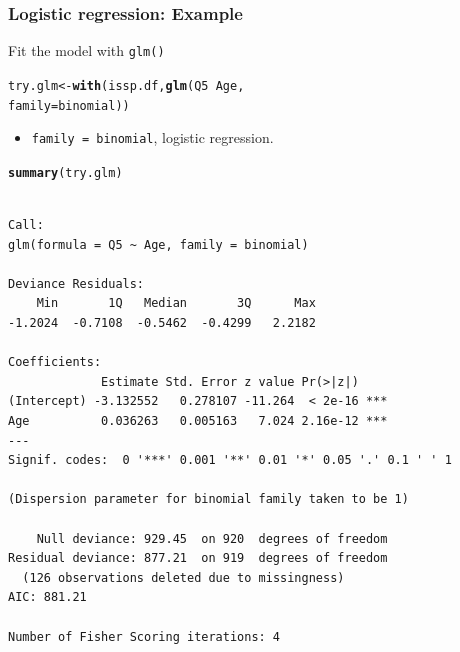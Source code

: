\documentclass{beamer}\usepackage[]{graphicx}\usepackage[]{color}
\makeatletter
\newcommand{\hlopt}[1]{\textcolor[rgb]{0,0,0}{#1}}%
\newcommand{\hlstd}[1]{\textcolor[rgb]{0.345,0.345,0.345}{#1}}%
\newcommand{\hlkwb}[1]{\textcolor[rgb]{0.69,0.353,0.396}{#1}}%
\newcommand{\hlkwc}[1]{\textcolor[rgb]{0.333,0.667,0.333}{#1}}%
\newcommand{\hlkwd}[1]{\textcolor[rgb]{0.737,0.353,0.396}{\textbf{#1}}}%
\newenvironment{kframe}{%
 \def\at@end@of@kframe{}%
 \ifinner\ifhmode%
  \def\at@end@of@kframe{\end{minipage}}%
  \begin{minipage}{\columnwidth}%
 \fi\fi%
 \def\FrameCommand##1{\hskip\@totalleftmargin \hskip-\fboxsep
 \colorbox{shadecolor}{##1}\hskip-\fboxsep
     \hskip-\linewidth \hskip-\@totalleftmargin \hskip\columnwidth}%
 \MakeFramed {\advance\hsize-\width
   \@totalleftmargin\z@ \linewidth\hsize
   \@setminipage}}%
 {\par\unskip\endMakeFramed%
 \at@end@of@kframe}
\newenvironment{knitrout}{}{} %
\makeatother
\begin{document}
\begin{frame}[fragile]
\frametitle{Logistic regression: Example}
Fit the model with \texttt{glm()}
\vspace{-2mm}
\begin{knitrout}
\color{fgcolor}\begin{kframe}
\begin{alltt}
\hlstd{try.glm} \hlkwb{<-} \hlkwd{with}\hlstd{(issp.df,} \hlkwd{glm}\hlstd{(Q5}\hlopt{~}\hlstd{Age,}
                             \hlkwc{family} \hlstd{= binomial))}
\end{alltt}
\end{kframe}
\end{knitrout}
\begin{itemize}
\item \texttt{family = binomial}, logistic regression.
\end{itemize}
\vspace{-2mm}
\begin{scriptsize}
\begin{knitrout}
\color{fgcolor}\begin{kframe}
\begin{alltt}
\hlkwd{summary}\hlstd{(try.glm)}
\end{alltt}
\end{kframe}
\end{knitrout}
\end{scriptsize}
\vspace{-5mm}
\begin{scriptsize}
\begin{knitrout}
\color{fgcolor}\begin{kframe}
\begin{verbatim}

Call:
glm(formula = Q5 ~ Age, family = binomial)

Deviance Residuals: 
    Min       1Q   Median       3Q      Max  
-1.2024  -0.7108  -0.5462  -0.4299   2.2182  

Coefficients:
             Estimate Std. Error z value Pr(>|z|)    
(Intercept) -3.132552   0.278107 -11.264  < 2e-16 ***
Age          0.036263   0.005163   7.024 2.16e-12 ***
---
Signif. codes:  0 '***' 0.001 '**' 0.01 '*' 0.05 '.' 0.1 ' ' 1

(Dispersion parameter for binomial family taken to be 1)

    Null deviance: 929.45  on 920  degrees of freedom
Residual deviance: 877.21  on 919  degrees of freedom
  (126 observations deleted due to missingness)
AIC: 881.21

Number of Fisher Scoring iterations: 4
\end{verbatim}
\end{kframe}
\end{knitrout}
\end{scriptsize}
\end{frame}
\end{document}
